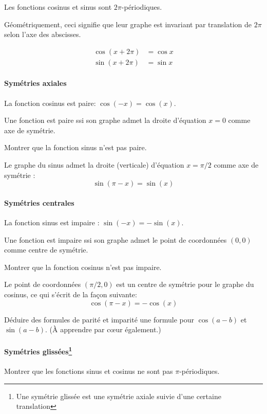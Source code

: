 Les fonctions cosinus et sinus sont $2\pi$-périodiques.
\begin{remarque}
Géométriquement, ceci signifie que leur graphe est invariant par translation de $2\pi$ selon l'axe des abscisses.
\end{remarque}


\begin{align*}
\cos(x+2\pi)&=\cos x\\
\sin(x+2\pi)&=\sin x
\end{align*}

\paragraph{Symétries axiales}

La fonction cosinus est paire: $ \cos(-x)=\cos(x)$.
\begin{remarque}
Une fonction est paire ssi son graphe admet la droite d'équation $x=0$ comme axe de symétrie.
\end{remarque}
\begin{exo}
Montrer que la fonction sinus n'est pas paire.
\end{exo}

Le graphe du sinus admet la droite (verticale) d'équation $x=\pi/2$ comme axe de symétrie :
\[ \sin(\pi-x)=\sin(x) \]

\paragraph{Symétries centrales}

La fonction sinus est impaire : $\sin(-x)=-\sin(x)$.
\begin{remarque}
Une fonction est impaire ssi son graphe admet le point de coordonnées $(0,0)$ comme centre de symétrie.
\end{remarque}
\begin{exo}
Montrer que la fonction cosinus n'est pas impaire.
\end{exo}

Le point de coordonnées $(\pi/2,0)$ est un centre de symétrie pour le graphe du cosinus, ce qui s'écrit de la façon suivante:
\[ \cos(\pi-x)=-\cos(x)\]


\begin{exo}
Déduire des formules de parité et imparité une formule pour $\cos(a-b)$ et $\sin(a-b)$. (À apprendre par c\oe ur également.)
\end{exo}

\paragraph{Symétries glissées\footnote{Une symétrie glissée est une symétrie axiale suivie d'une certaine translation}}
\begin{exo}
Montrer que les fonctions sinus et cosinus ne sont pas $\pi$-périodiques.
\end{exo}

